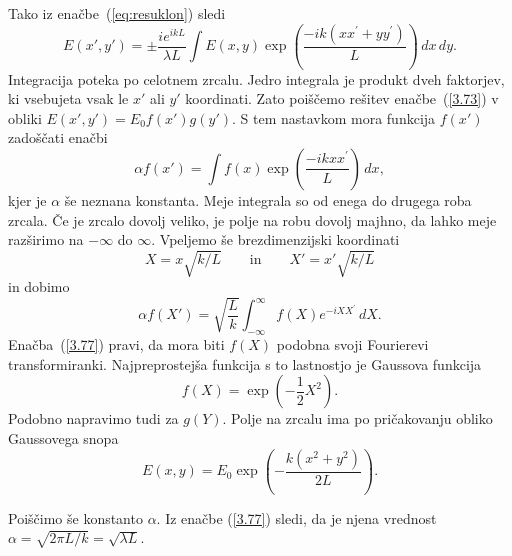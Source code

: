 Tako iz enačbe~(\ref{eq:resuklon}) sledi
\begin{equation}
E(x',y')=\pm\frac{ie^{ikL}}{\lambda L}\int E(x,y)\exp
\left(\frac{-ik(xx^{\prime}+yy^{\prime})}{L}\right)\, dx\, dy.
\label{3.73}
\end{equation}
Integracija poteka po celotnem zrcalu. Jedro integrala je produkt dveh
faktorjev, ki vsebujeta vsak le $x'$ ali $y'$ koordinati. Zato poiščemo
rešitev enačbe~(\ref{3.73}) v obliki  
$E(x',y')=E_{0}f(x')g(y')$.
S tem nastavkom mora funkcija $f(x')$ zadoščati enačbi
\begin{equation}
\alpha f(x')=\int f(x)\exp\left(\frac{-ikxx^{\prime}}{L}\right)\, dx,
\label{3.75}
\end{equation}
kjer je $\alpha$ še neznana konstanta. Meje integrala so od enega do 
drugega roba zrcala. Če je zrcalo dovolj veliko,
je polje na robu dovolj majhno, da lahko meje razširimo
na $-\infty$ do $\infty$. Vpeljemo še brezdimenzijski koordinati
\begin{equation}
X=x\sqrt{k/L} \qquad \mathrm{in} \qquad X'=x'\sqrt{k/L}
\label{3.76}
\end{equation}
in dobimo
\begin{equation}
\alpha f(X')=\sqrt{\frac{L}{k}}\int_{-\infty}^{\infty}f(X)e^{-iXX^{\prime}}\, dX.
\label{3.77}
\end{equation}
Enačba~(\ref{3.77}) pravi, da mora
biti $f(X)$ podobna svoji Fourierevi transformiranki. Najpreprostejša
funkcija s to lastnostjo je Gaussova funkcija 
\begin{equation}
f(X)=\exp\left(-\frac{1}{2}X^{2}\right)\!\!.
\label{3.78}
\end{equation}
Podobno napravimo tudi za $g(Y)$. Polje na zrcalu ima po pričakovanju obliko Gaussovega snopa
\begin{equation}
E(x,y)=E_{0}\exp\left(-\frac{k(x^{2}+y^{2})}{2L}\right)\!\!.
\label{3.79}
\end{equation}

Poiščimo še konstanto $\alpha$. Iz enačbe (\ref{3.77}) sledi, da je njena vrednost 
$\alpha = \sqrt{2\pi L/k}=\sqrt{\lambda L}$. 

